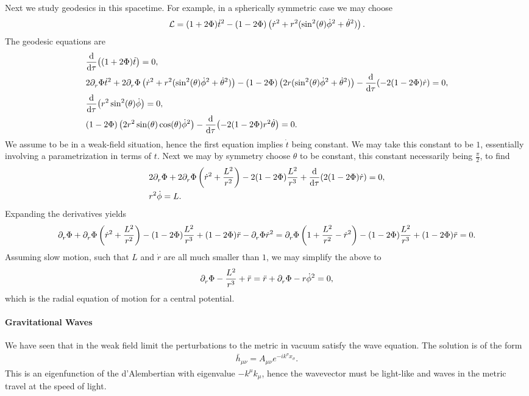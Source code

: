 Next we study geodesics in this spacetime. For example, in a spherically symmetric case we may choose
\begin{align*}
	\mathcal{L} = (1 + 2\Phi)\dot{t}^{2} - (1 - 2\Phi)\left(\dot{r}^{2} + r^{2}(\sin[2](\theta)\dot{\phi}^{2} + \dot{\theta}^{2})\right).
\end{align*}
The geodesic equations are
\begin{align*}
	&\dv{\tau}((1 + 2\Phi)\dot{t}) = 0, \\
	&2\partial^{}_{r}\Phi\dot{t}^{2} + 2\partial^{}_{r}\Phi\left(\dot{r}^{2} + r^{2}(\sin[2](\theta)\dot{\phi}^{2} + \dot{\theta}^{2})\right) - (1 - 2\Phi)\left(2r(\sin[2](\theta)\dot{\phi}^{2} + \dot{\theta}^{2})\right) - \dv{\tau}(-2(1 - 2\Phi)\dot{r}) = 0, \\
	&\dv{\tau}(r^{2}\sin[2](\theta)\dot{\phi}) = 0, \\
	&(1 - 2\Phi)\left(2r^{2}\sin(\theta)\cos(\theta)\dot{\phi}^{2}\right) - \dv{\tau}(-2(1 - 2\Phi)r^{2}\dot{\theta}) = 0.
\end{align*}
We assume to be in a weak-field situation, hence the first equation implies $\dot{t}$ being constant. We may take this constant to be $1$, essentially involving a parametrization in terms of $t$. Next we may by symmetry choose $\theta$ to be constant, this constant necessarily being $\frac{\pi}{2}$, to find
\begin{align*}
	&2\partial^{}_{r}\Phi + 2\partial^{}_{r}\Phi\left(\dot{r}^{2} + \frac{L^{2}}{r^{2}}\right) - 2(1 - 2\Phi)\frac{L^{2}}{r^{3}} + \dv{\tau}(2(1 - 2\Phi)\dot{r}) = 0, \\
	&r^{2}\dot{\phi} = L.
\end{align*}
Expanding the derivatives yields
\begin{align*}
	\partial^{}_{r}\Phi + \partial^{}_{r}\Phi\left(\dot{r}^{2} + \frac{L^{2}}{r^{2}}\right) - (1 - 2\Phi)\frac{L^{2}}{r^{3}} + (1 - 2\Phi)\ddot{r} - \partial^{}_{r}\Phi\dot{r}^{2} = \partial^{}_{r}\Phi\left(1 + \frac{L^{2}}{r^{2}} - \dot{r}^{2}\right) - (1 - 2\Phi)\frac{L^{2}}{r^{3}} + (1 - 2\Phi)\ddot{r} = 0.
\end{align*}
Assuming slow motion, such that $L$ and $\dot{r}$ are all much smaller than $1$, we may simplify the above to
\begin{align*}
	\partial^{}_{r}\Phi - \frac{L^{2}}{r^{3}} + \ddot{r} = \ddot{r} + \partial^{}_{r}\Phi - r\dot{\phi}^{2} = 0,
\end{align*}
which is the radial equation of motion for a central potential.

\paragraph{Gravitational Waves}
We have seen that in the weak field limit the perturbations to the metric in vacuum satisfy the wave equation. The solution is of the form
\begin{align*}
	\bar{h}_{\mu\nu} = A_{\mu\nu}e^{-ik^{\sigma}x_{\sigma}}.
\end{align*}
This is an eigenfunction of the d'Alembertian with eigenvalue $-k^{\mu}k_{\mu}$, hence the wavevector must be light-like and waves in the metric travel at the speed of light.


